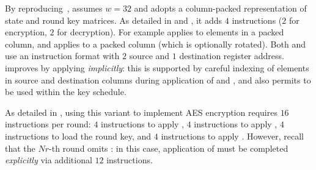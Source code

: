 
By reproducing~\cite[Section 4.3]{TilGro:06},
assumes 
$w = 32$
and adopts a 
column-packed 
representation of state and round key matrices.
As detailed in
and
,
it adds
$ 4$
instructions ($2$ for encryption, $2$ for decryption).
For example
applies   to elements in a packed column,
and
applies  to             a packed column (which is optionally rotated).
Both 
and
use an instruction format with $2$ source and $1$ destination register address.
 improves  by applying  
{\em implicitly}:
this is supported by careful indexing of elements in source and destination
columns during application of  and ,
and also permits
to be used within the key schedule.

As detailed in
,
using this variant to implement AES encryption requires
$16$
instructions per round:
$ 4$  instructions to apply ,
$ 4$  instructions to apply ,
$ 4$           instructions to load the round key,
and
$ 4$           instructions to apply .
However, recall that the $Nr$-th round omits : in this
case, application of  must be completed 
{\em explicitly}
via additional 
$12$
instructions.

